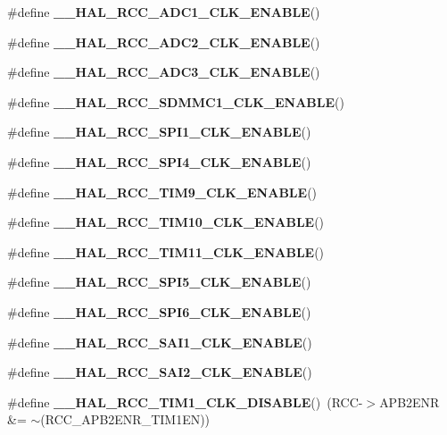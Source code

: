\begin{DoxyCompactItemize}
\item 
\#define {\bfseries \+\_\+\+\_\+\+H\+A\+L\+\_\+\+R\+C\+C\+\_\+\+A\+D\+C1\+\_\+\+C\+L\+K\+\_\+\+E\+N\+A\+B\+LE}()
\item 
\#define {\bfseries \+\_\+\+\_\+\+H\+A\+L\+\_\+\+R\+C\+C\+\_\+\+A\+D\+C2\+\_\+\+C\+L\+K\+\_\+\+E\+N\+A\+B\+LE}()
\item 
\#define {\bfseries \+\_\+\+\_\+\+H\+A\+L\+\_\+\+R\+C\+C\+\_\+\+A\+D\+C3\+\_\+\+C\+L\+K\+\_\+\+E\+N\+A\+B\+LE}()
\item 
\#define {\bfseries \+\_\+\+\_\+\+H\+A\+L\+\_\+\+R\+C\+C\+\_\+\+S\+D\+M\+M\+C1\+\_\+\+C\+L\+K\+\_\+\+E\+N\+A\+B\+LE}()
\item 
\#define {\bfseries \+\_\+\+\_\+\+H\+A\+L\+\_\+\+R\+C\+C\+\_\+\+S\+P\+I1\+\_\+\+C\+L\+K\+\_\+\+E\+N\+A\+B\+LE}()
\item 
\#define {\bfseries \+\_\+\+\_\+\+H\+A\+L\+\_\+\+R\+C\+C\+\_\+\+S\+P\+I4\+\_\+\+C\+L\+K\+\_\+\+E\+N\+A\+B\+LE}()
\item 
\#define {\bfseries \+\_\+\+\_\+\+H\+A\+L\+\_\+\+R\+C\+C\+\_\+\+T\+I\+M9\+\_\+\+C\+L\+K\+\_\+\+E\+N\+A\+B\+LE}()
\item 
\#define {\bfseries \+\_\+\+\_\+\+H\+A\+L\+\_\+\+R\+C\+C\+\_\+\+T\+I\+M10\+\_\+\+C\+L\+K\+\_\+\+E\+N\+A\+B\+LE}()
\item 
\#define {\bfseries \+\_\+\+\_\+\+H\+A\+L\+\_\+\+R\+C\+C\+\_\+\+T\+I\+M11\+\_\+\+C\+L\+K\+\_\+\+E\+N\+A\+B\+LE}()
\item 
\#define {\bfseries \+\_\+\+\_\+\+H\+A\+L\+\_\+\+R\+C\+C\+\_\+\+S\+P\+I5\+\_\+\+C\+L\+K\+\_\+\+E\+N\+A\+B\+LE}()
\item 
\#define {\bfseries \+\_\+\+\_\+\+H\+A\+L\+\_\+\+R\+C\+C\+\_\+\+S\+P\+I6\+\_\+\+C\+L\+K\+\_\+\+E\+N\+A\+B\+LE}()
\item 
\#define {\bfseries \+\_\+\+\_\+\+H\+A\+L\+\_\+\+R\+C\+C\+\_\+\+S\+A\+I1\+\_\+\+C\+L\+K\+\_\+\+E\+N\+A\+B\+LE}()
\item 
\#define {\bfseries \+\_\+\+\_\+\+H\+A\+L\+\_\+\+R\+C\+C\+\_\+\+S\+A\+I2\+\_\+\+C\+L\+K\+\_\+\+E\+N\+A\+B\+LE}()
\item 
\mbox{\label{group___r_c_c_ex___peripheral___clock___enable___disable_gaa9eacfb8ee244074ec63dae0b9f621c2}} 
\#define {\bfseries \+\_\+\+\_\+\+H\+A\+L\+\_\+\+R\+C\+C\+\_\+\+T\+I\+M1\+\_\+\+C\+L\+K\+\_\+\+D\+I\+S\+A\+B\+LE}()~(R\+CC-\/$>$A\+P\+B2\+E\+NR \&= $\sim$(R\+C\+C\+\_\+\+A\+P\+B2\+E\+N\+R\+\_\+\+T\+I\+M1\+EN))
\item 

\end{DoxyCompactItemize}
